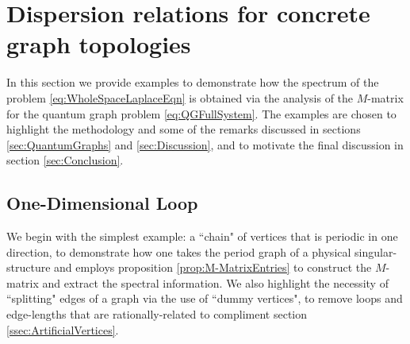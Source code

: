 \section{Dispersion relations for concrete graph topologies} \label{sec:Examples}
In this section we provide examples to demonstrate how the spectrum of the problem \eqref{eq:WholeSpaceLaplaceEqn} is obtained via the analysis of the $M$-matrix for the quantum graph problem \eqref{eq:QGFullSystem}.
The examples are chosen to highlight the methodology and some of the remarks discussed in sections \ref{sec:QuantumGraphs} and \ref{sec:Discussion}, and to motivate the final discussion in section \ref{sec:Conclusion}. 

\subsection{One-Dimensional Loop} \label{ssec:Example1DLoop}
We begin with the simplest example: a ``chain" of vertices that is periodic in one direction, to demonstrate how one takes the period graph of a physical singular-structure and employs proposition \ref{prop:M-MatrixEntries} to construct the $M$-matrix and extract the spectral information.
We also highlight the necessity of ``splitting" edges of a graph via the use of ``dummy vertices", to remove loops and edge-lengths that are rationally-related to compliment section \ref{ssec:ArtificialVertices}.


